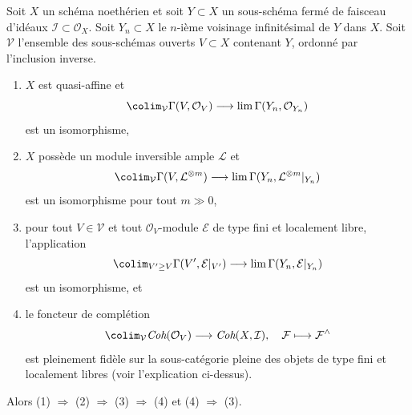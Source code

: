 \begin{lemma}
\label{lemma-completion-fully-faithful-general}
Soit $X$ un schéma noethérien et soit $Y \subset X$ un sous-schéma fermé
de faisceau d'idéaux $\mathcal{I} \subset \mathcal{O}_X$.
Soit $Y_n \subset X$ le $n$-ième voisinage infinitésimal de $Y$ dans $X$.
Soit $\mathcal{V}$ l'ensemble des sous-schémas ouverts $V \subset X$ contenant $Y$,
ordonné par l'inclusion inverse.
\begin{enumerate}
\item $X$ est quasi-affine et
$$
\colim_\mathcal{V} \Gamma(V, \mathcal{O}_V)
\longrightarrow
\lim \Gamma(Y_n, \mathcal{O}_{Y_n})
$$
est un isomorphisme,
\item $X$ possède un module inversible ample $\mathcal{L}$ et
$$
\colim_\mathcal{V} \Gamma(V, \mathcal{L}^{\otimes m})
\longrightarrow
\lim \Gamma(Y_n, \mathcal{L}^{\otimes m}|_{Y_n})
$$
est un isomorphisme pour tout $m \gg 0$,
\item pour tout $V \in \mathcal{V}$ et tout
$\mathcal{O}_V$-module $\mathcal{E}$ de type fini et localement libre, l'application
$$
\colim_{V' \geq V} \Gamma(V', \mathcal{E}|_{V'})
\longrightarrow
\lim \Gamma(Y_n, \mathcal{E}|_{Y_n})
$$
est un isomorphisme, et
\item le foncteur de complétion
$$
\colim_\mathcal{V} \textit{Coh}(\mathcal{O}_V)
\longrightarrow
\textit{Coh}(X, \mathcal{I}),
\quad
\mathcal{F} \longmapsto \mathcal{F}^\wedge
$$
est pleinement fidèle sur la sous-catégorie pleine des
objets de type fini et localement libres (voir l'explication ci-dessus).
\end{enumerate}
Alors (1) $\Rightarrow$ (2) $\Rightarrow$ (3) $\Rightarrow$ (4)
et (4) $\Rightarrow$ (3).
\end{lemma}

